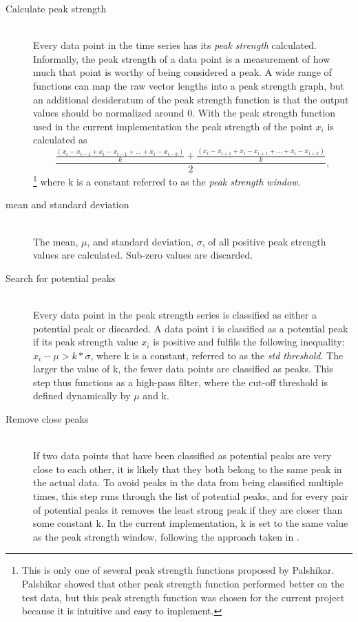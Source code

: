 \begin{description}

\item[Calculate peak strength] \hfill \\
Every data point in the time series has its \emph{peak strength} calculated. Informally, the peak strength of a data point is a measurement of how much that point is worthy of being considered a peak. A wide range of functions can map the raw vector lengths into a peak strength graph, but an additional desideratum of the peak strength function is that the output values should be normalized around 0. With the peak strength function used in the current implementation the peak strength of the point $x_i$ is calculated as $$\frac{\frac{(x_{i} - x_{i-1} + x_{i} - x_{i-1} + \ldots + x_{i} - x_{i-k})}{k} + \frac{(x_{i} - x_{i+1} + x_{i} - x_{i+1} + \ldots + x_{i} - x_{i+k})}{k}}{2},$$\footnote{This is only one of several peak strength functions proposed by Palshikar\cite{stepDetection}. Palshikar showed that other peak strength function performed better on the test data, but this peak strength function was chosen for the current project because it is intuitive and easy to implement.} where k is a constant referred to as the \emph{peak strength window}. 

\item [mean and standard deviation] \hfill \\
The mean, $\mu$, and standard deviation, $\sigma$, of all positive peak strength values are calculated. Sub-zero values are discarded.

\item[Search for potential peaks] \hfill \\
Every data point in the peak strength series is classified as either a potential peak or discarded. A data point i is classified as a potential peak if its peak strength value $x_i$ is positive and fulfils the following inequality: $x_i - \mu > k * \sigma$, where k is a constant, referred to as the \emph{std threshold}. The larger the value of k, the fewer data points are classified as peaks. This step thus functions as a high-pass filter, where the cut-off threshold is defined dynamically by $\mu$ and k.

\item[Remove close peaks] \hfill \\
If two data points that have been classified as potential peaks are very close to each other, it is likely that they both belong to the same peak in the actual data. To avoid peaks in the data from being classified multiple times, this step runs through the list of potential peaks, and for every pair of potential peaks it removes the least strong peak if they are closer than some constant k. In the current implementation, k is set to the same value as the peak strength window, following the approach taken in \cite{SimplePeakDetect}.

\end{description}

